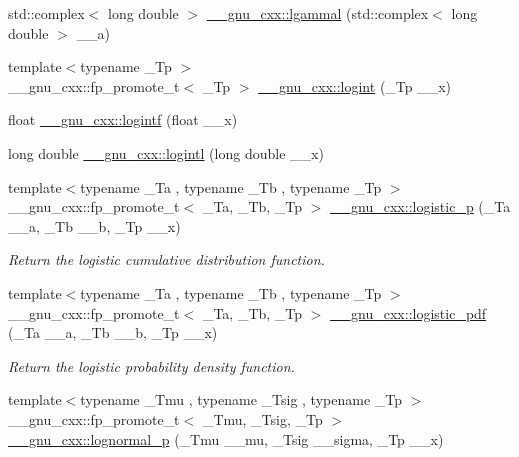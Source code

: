 \begin{DoxyCompactItemize}
\item 
std\+::complex$<$ long double $>$ \hyperlink{group__gnu__math__spec__func_ga5f12f60afe9a47f4ca04964f642bbf0d}{\+\_\+\+\_\+gnu\+\_\+cxx\+::lgammal} (std\+::complex$<$ long double $>$ \+\_\+\+\_\+a)
\item 
{\footnotesize template$<$typename \+\_\+\+Tp $>$ }\\\+\_\+\+\_\+gnu\+\_\+cxx\+::fp\+\_\+promote\+\_\+t$<$ \+\_\+\+Tp $>$ \hyperlink{group__gnu__math__spec__func_ga1c0fe0f4cb72041f24db82dc7e47df11}{\+\_\+\+\_\+gnu\+\_\+cxx\+::logint} (\+\_\+\+Tp \+\_\+\+\_\+x)
\item 
float \hyperlink{group__gnu__math__spec__func_gab878da3ba2f5c1d49d96eadde533b233}{\+\_\+\+\_\+gnu\+\_\+cxx\+::logintf} (float \+\_\+\+\_\+x)
\item 
long double \hyperlink{group__gnu__math__spec__func_gab17f5cadc8f77ba2666d0d5ecc78de5d}{\+\_\+\+\_\+gnu\+\_\+cxx\+::logintl} (long double \+\_\+\+\_\+x)
\item 
{\footnotesize template$<$typename \+\_\+\+Ta , typename \+\_\+\+Tb , typename \+\_\+\+Tp $>$ }\\\+\_\+\+\_\+gnu\+\_\+cxx\+::fp\+\_\+promote\+\_\+t$<$ \+\_\+\+Ta, \+\_\+\+Tb, \+\_\+\+Tp $>$ \hyperlink{group__gnu__math__spec__func_ga5a5d9c5e7ab822f84578415be8609f49}{\+\_\+\+\_\+gnu\+\_\+cxx\+::logistic\+\_\+p} (\+\_\+\+Ta \+\_\+\+\_\+a, \+\_\+\+Tb \+\_\+\+\_\+b, \+\_\+\+Tp \+\_\+\+\_\+x)
\begin{DoxyCompactList}\small\item\em Return the logistic cumulative distribution function. \end{DoxyCompactList}\item 
{\footnotesize template$<$typename \+\_\+\+Ta , typename \+\_\+\+Tb , typename \+\_\+\+Tp $>$ }\\\+\_\+\+\_\+gnu\+\_\+cxx\+::fp\+\_\+promote\+\_\+t$<$ \+\_\+\+Ta, \+\_\+\+Tb, \+\_\+\+Tp $>$ \hyperlink{group__gnu__math__spec__func_gaeb3e768c11c8cd11804827a09f19b1e3}{\+\_\+\+\_\+gnu\+\_\+cxx\+::logistic\+\_\+pdf} (\+\_\+\+Ta \+\_\+\+\_\+a, \+\_\+\+Tb \+\_\+\+\_\+b, \+\_\+\+Tp \+\_\+\+\_\+x)
\begin{DoxyCompactList}\small\item\em Return the logistic probability density function. \end{DoxyCompactList}\item 
{\footnotesize template$<$typename \+\_\+\+Tmu , typename \+\_\+\+Tsig , typename \+\_\+\+Tp $>$ }\\\+\_\+\+\_\+gnu\+\_\+cxx\+::fp\+\_\+promote\+\_\+t$<$ \+\_\+\+Tmu, \+\_\+\+Tsig, \+\_\+\+Tp $>$ \hyperlink{group__gnu__math__spec__func_ga3bbd4feb10f2d745bf8aca8748099c53}{\+\_\+\+\_\+gnu\+\_\+cxx\+::lognormal\+\_\+p} (\+\_\+\+Tmu \+\_\+\+\_\+mu, \+\_\+\+Tsig \+\_\+\+\_\+sigma, \+\_\+\+Tp \+\_\+\+\_\+x)

\end{DoxyCompactItemize}
